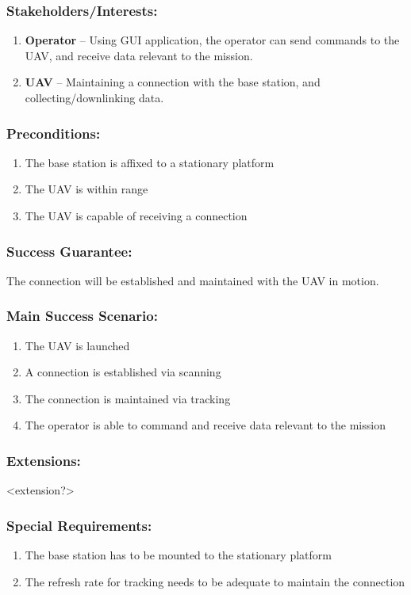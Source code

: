\documentclass[ProductRequirements.tex]{subfiles}
\begin{document}
	\subsubsection*{Stakeholders/Interests:}
	\begin{enumerate}\itemsep1pt
		\item \textbf{Operator} -- Using GUI application, the operator can send commands to the UAV, and receive data relevant to the mission. 
		\item \textbf{UAV} -- Maintaining a connection with the base station, and collecting/downlinking data. 
	\end{enumerate}
	\subsubsection*{Preconditions:}
	\begin{enumerate}\itemsep1pt
		\item The base station is affixed to a stationary platform
		\item The UAV is within range
		\item The UAV is capable of receiving a connection
	\end{enumerate}
	\subsubsection*{Success Guarantee:}
	The connection will be established and maintained with the UAV in motion.
	\subsubsection*{Main Success Scenario:}
	\begin{enumerate}\itemsep1pt
		\item The UAV is launched
		\item A connection is established via scanning
		\item The connection is maintained via tracking
		\item The operator is able to command and receive data relevant to the mission 
	\end{enumerate}
	\subsubsection*{Extensions:}
	<extension?>
	\subsubsection*{Special Requirements:}
	\begin{enumerate}\itemsep1pt
		\item The base station has to be mounted to the stationary platform
		\item The refresh rate for tracking needs to be adequate to maintain the connection
	\end{enumerate}
\end{document}
